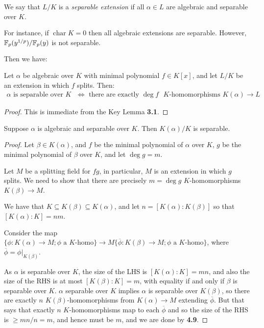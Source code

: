 \documentclass[a4paper, 10pt, twocolumn]{amsart}
\renewcommand{\charr}{\operatorname{char}}
\begin{document}
We say that $L/K$ is a \emph{separable extension} if all $\alpha \in L$ are algebraic and separable over $K$.

For instance, if $\charr K = 0$ then all algebraic extensions are separable. However, $\mathbb{F}_p(y^{1/p}) / \mathbb{F}_p(y)$ is not separable.

Then we have:
\begin{lemma}
Let $\alpha$ be algebraic over $K$ with minimal polynomial $f \in K[x]$, and let $L/K$ be an extension in which $f$ splits. Then:
\begin{align*}
\alpha \text{ is separable over $K$ } \iff \text{ there are exactly $\deg f$ $K$-homomorphisms $K(\alpha)\to L$}
\end{align*}
\end{lemma}
\begin{proof}
This is immediate from the Key Lemma \textbf{3.1}.
\end{proof}
\begin{proposition}
Suppose $\alpha$ is algebraic and separable over $K$. Then $K(\alpha)/K$ is separable.
\end{proposition}
\begin{proof}
Let $\beta \in K(\alpha)$, and $f$ be the minimal polynomial of $\alpha$ over $K$, $g$ be the minimal polynomial of $\beta$ over $K$, and let $\deg g = m$.

Let $M$ be a splitting field for $fg$, in particular, $M$ is an extension in which $g$ splits. We need to show that there are precisely $m = \deg g$ $K$-homomorphisms $K(\beta)\to M$.

We have that $K\subseteq K(\beta) \subseteq K(\alpha)$, and let $n = [K(\alpha):K(\beta)]$ so that $[K(\alpha):K] = nm$.

Consider the map $\{\phi : K(\alpha)\to M; \phi \text{ a $K$-homo}\} \to M\{\overline{\phi}:K(\beta)\to M; \phi \text{ a $K$-homo}\}$, where $\overline{\phi} = \phi|_{K(\beta)}$.

As $\alpha$ is separable over $K$, the size of the LHS is $[K(\alpha):K] = mn$, and also the size of the RHS is at most $[K(\beta):K] = m$, with equality if and only if $\beta$ is separable over $K$. $\alpha$ separable over $K$ implies $\alpha$ is separable over $K(\beta)$, so there are exactly $n$ $K(\beta)$-homomorphisms from $K(\alpha)\to M$ extending $\overline{\phi}$. But that says that exactly $n$ $K$-homomorphisms map to each $\overline{\phi}$ and so the size of the RHS is $\geq mn/n = m$, and hence must be $m$, and we are done by \textbf{4.9}.
\end{proof}
\end{document}

